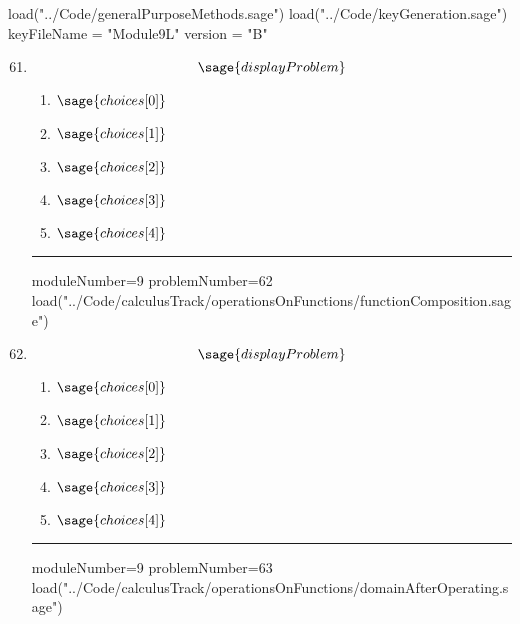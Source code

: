 \documentclass[14pt]{article}
\newcommand{\litem}[1]{\item#1\hspace*{-1cm}\rule{\textwidth}{0.4pt}}
\begin{document}
\pagestyle{fancy}

\begin{sagesilent}
load("../Code/generalPurposeMethods.sage")
load("../Code/keyGeneration.sage")
keyFileName = "Module9L"
version = "B"
\end{sagesilent}

\begin{enumerate}
\setcounter{enumi}{60}


\begin{sagesilent}
moduleNumber=9
problemNumber=61
load("../Code/calculusTrack/operationsOnFunctions/findInversePolyOrRadical.sage")
\end{sagesilent}

\litem{ 

 \[ \sage{displayProblem} \]

	\begin{enumerate}[label=\Alph*.]
  \item \( \sage{choices[0]} \)
  \item \( \sage{choices[1]} \)
  \item \( \sage{choices[2]} \)
  \item \( \sage{choices[3]} \)
  \item \( \sage{choices[4]} \)
	\end{enumerate}
}

\begin{sagesilent}
moduleNumber=9
problemNumber=62
load("../Code/calculusTrack/operationsOnFunctions/functionComposition.sage")
\end{sagesilent}

\litem{ 

 \[ \sage{displayProblem} \]

	\begin{enumerate}[label=\Alph*.]
  \item \( \sage{choices[0]} \)
  \item \( \sage{choices[1]} \)
  \item \( \sage{choices[2]} \)
  \item \( \sage{choices[3]} \)
  \item \( \sage{choices[4]} \)
	\end{enumerate}
}

\begin{sagesilent}
moduleNumber=9
problemNumber=63
load("../Code/calculusTrack/operationsOnFunctions/domainAfterOperating.sage")
\end{sagesilent}


\end{enumerate}
\end{document}
